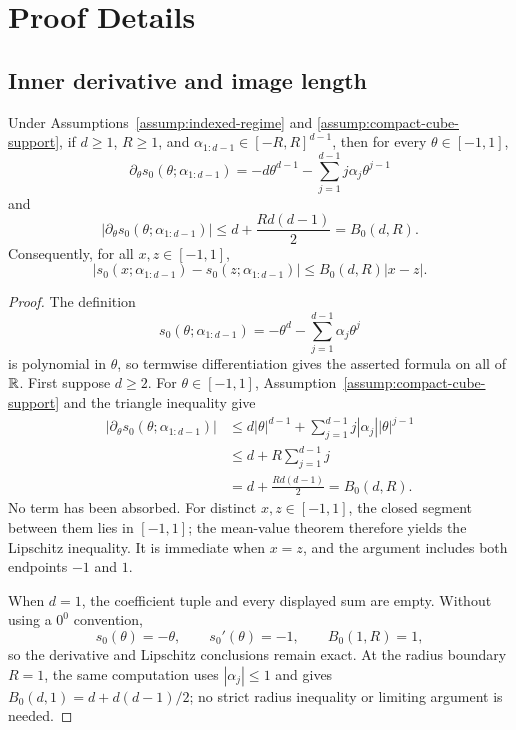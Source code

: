 \appendix

\section{Proof Details}

\subsection{Inner derivative and image length}
\label{app:inner-certificate}

\begin{lemma}
\label{lem:inner-derivative}
Under Assumptions~\ref{assump:indexed-regime} and
\ref{assump:compact-cube-support}, if $d\geq1$, $R\geq1$, and
$\alpha_{1:d-1}\in[-R,R]^{d-1}$, then for every $\theta\in[-1,1]$,
\[
\partial_\theta s_0(\theta;\alpha_{1:d-1})
=-d\theta^{d-1}-\sum_{j=1}^{d-1}j\alpha_j\theta^{j-1}
\]
and
\[
\bigl|\partial_\theta s_0(\theta;\alpha_{1:d-1})\bigr|
\leq d+\frac{Rd(d-1)}2=B_0(d,R).
\]
Consequently, for all $x,z\in[-1,1]$,
\[
|s_0(x;\alpha_{1:d-1})-s_0(z;\alpha_{1:d-1})|
\leq B_0(d,R)|x-z|.
\]
\end{lemma}

\begin{proof}
The definition
\[
s_0(\theta;\alpha_{1:d-1})
=-\theta^d-\sum_{j=1}^{d-1}\alpha_j\theta^j
\]
is polynomial in $\theta$, so termwise differentiation gives the asserted
formula on all of $\mathbb{R}$.  First suppose $d\geq2$.  For
$\theta\in[-1,1]$, Assumption~\ref{assump:compact-cube-support} and the
triangle inequality give
\[
\begin{aligned}
\bigl|\partial_\theta s_0(\theta;\alpha_{1:d-1})\bigr|
&\leq d|\theta|^{d-1}
 +\sum_{j=1}^{d-1}j|\alpha_j||\theta|^{j-1}\\
&\leq d+R\sum_{j=1}^{d-1}j\\
&=d+\frac{Rd(d-1)}2
=B_0(d,R).
\end{aligned}
\]
No term has been absorbed.  For distinct $x,z\in[-1,1]$, the closed segment
between them lies in $[-1,1]$; the mean-value theorem therefore yields the
Lipschitz inequality.  It is immediate when $x=z$, and the argument includes
both endpoints $-1$ and $1$.

When $d=1$, the coefficient tuple and every displayed sum are empty.  Without
using a $0^0$ convention,
\[
s_0(\theta)=-\theta,\qquad s_0'(\theta)=-1,
\qquad B_0(1,R)=1,
\]
so the derivative and Lipschitz conclusions remain exact.  At the radius
boundary $R=1$, the same computation uses $|\alpha_j|\leq1$ and gives
$B_0(d,1)=d+d(d-1)/2$; no strict radius inequality or limiting argument is
needed.
\end{proof}

